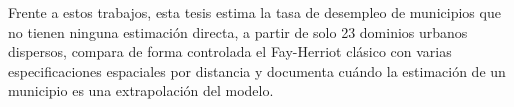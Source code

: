Frente a estos trabajos, esta tesis estima la tasa de desempleo de municipios que no tienen ninguna estimación directa, a partir de solo 23 dominios urbanos dispersos, compara de forma controlada el Fay-Herriot clásico con varias especificaciones espaciales por distancia y documenta cuándo la estimación de un municipio es una extrapolación del modelo.
